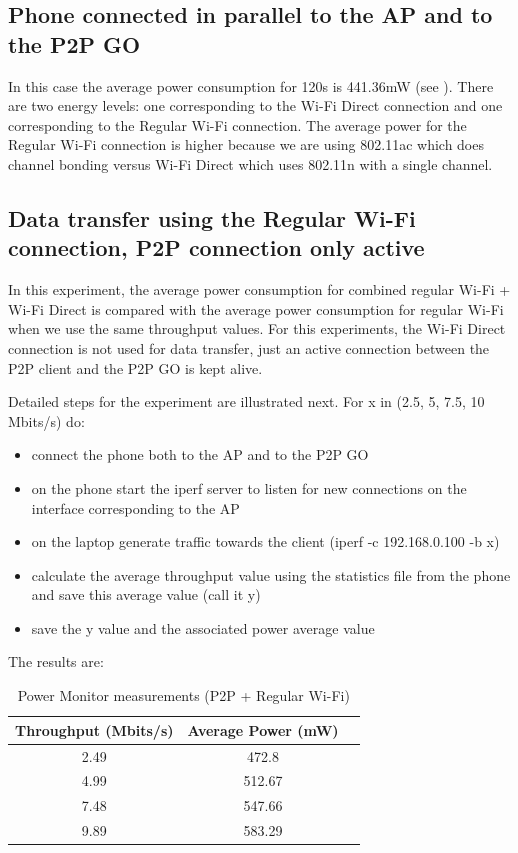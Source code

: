 \subsection{Phone connected in parallel to the AP and to the P2P GO}
\label{sub-sec:app2p-parallel}
In this case the average power consumption for 120s is 441.36mW (see ). There are two energy levels: one corresponding to the Wi-Fi Direct connection and one corresponding to the Regular Wi-Fi connection. The average power for the Regular Wi-Fi connection is higher because we are using 802.11ac which does channel bonding \cite{cite-bonding} versus Wi-Fi Direct which uses 802.11n with a single channel.


\subsection{Data transfer using the Regular Wi-Fi connection, P2P connection only active}
\label{sub-sec:transfer-parallel}

In this experiment, the average power consumption for combined regular Wi-Fi + Wi-Fi Direct is compared with the average power consumption for regular Wi-Fi when we use the same throughput values. For this experiments, the Wi-Fi Direct connection is not used for data transfer, just an active connection between the P2P client and the P2P GO is kept alive. 

Detailed steps for the experiment are illustrated next. For x in (2.5, 5, 7.5, 10 Mbits/s) do:
\begin{itemize}
  \item connect the phone both to the AP and to the P2P GO
  \item on the phone start the iperf server to listen for new connections on the interface corresponding to the AP
  \item on the laptop generate traffic towards the client (iperf -c 192.168.0.100 -b x)
  \item calculate the average throughput value using the statistics file from the phone and save this average value (call it y)
  \item save the y value and the associated power average value
\end{itemize}

The results are:

\begin{table}[h!]
  \centering
  \caption{Power Monitor measurements (P2P + Regular Wi-Fi)}
  \label{tab:table1}
  \begin{tabular}{ccc}
    \toprule
    Throughput (Mbits/s) & Average Power (mW) \\
    \midrule
    2.49 & 472.8\\
    4.99 & 512.67\\
    7.48 & 547.66\\
    9.89 & 583.29\\
    \bottomrule
  \end{tabular}
\end{table}

